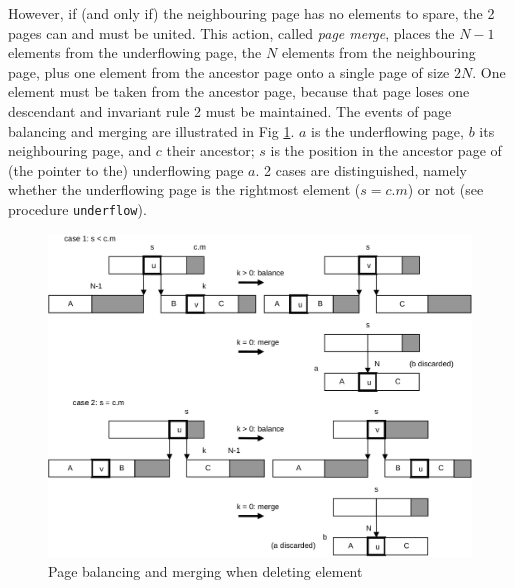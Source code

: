 However, if (and only if) the neighbouring page has no elements to spare, the 2 pages can and must be
united. This action, called \emph{page merge}, places the $N-1$ elements from the underflowing page,
the $N$ elements from the neighbouring page, plus one element from the ancestor page onto a single page
of size $2N$. One element must be taken from the ancestor page, because that page loses one descendant
and invariant rule 2 must be maintained. The events of page balancing and merging are illustrated in
Fig \ref{fig:page-merge}.  $a$ is the underflowing page, $b$ its neighbouring page, and $c$ their
ancestor; $s$ is the position in the ancestor page of (the pointer to the) underflowing page $a$.  2
cases are distinguished, namely whether the underflowing page is the rightmost element ($s = c.m$)
or not (see procedure \verb|underflow|).
\begin{figure}
  \label{fig:page-merge}
  \centering
  \includegraphics[width=.95\textwidth]{i/p}
  \caption{Page balancing and merging when deleting element}
\end{figure}

